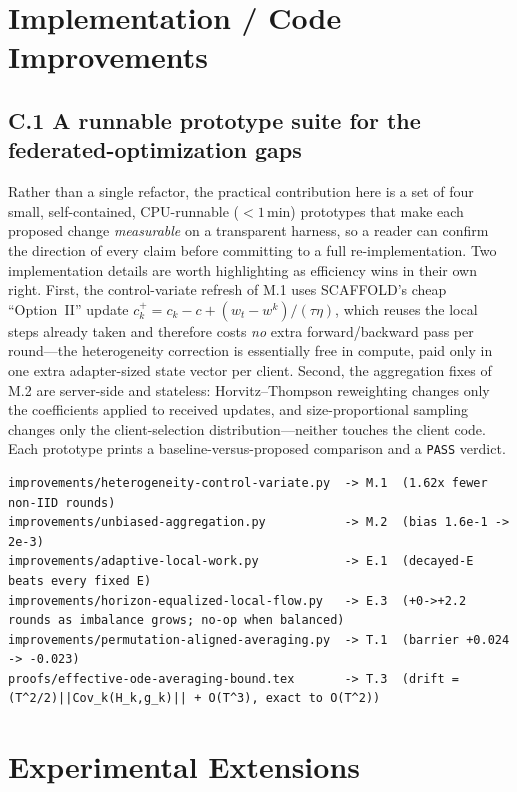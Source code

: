 \documentclass[11pt]{article}
\begin{document}
\section*{Implementation / Code Improvements}

\subsection*{C.1 A runnable prototype suite for the federated-optimization gaps}

Rather than a single refactor, the practical contribution here is a set of four small, self-contained, CPU-runnable ($<1$\,min) prototypes that make each proposed change \emph{measurable} on a transparent harness, so a reader can confirm the direction of every claim before committing to a full re-implementation. Two implementation details are worth highlighting as efficiency wins in their own right. First, the control-variate refresh of M.1 uses SCAFFOLD's cheap ``Option~II'' update $c_k^{+}=c_k-c+(w_t-w^k)/(\tau\eta)$, which reuses the local steps already taken and therefore costs \emph{no} extra forward/backward pass per round---the heterogeneity correction is essentially free in compute, paid only in one extra adapter-sized state vector per client. Second, the aggregation fixes of M.2 are server-side and stateless: Horvitz--Thompson reweighting changes only the coefficients applied to received updates, and size-proportional sampling changes only the client-selection distribution---neither touches the client code. Each prototype prints a baseline-versus-proposed comparison and a \texttt{PASS} verdict.

\begin{lstlisting}
improvements/heterogeneity-control-variate.py  -> M.1  (1.62x fewer non-IID rounds)
improvements/unbiased-aggregation.py           -> M.2  (bias 1.6e-1 -> 2e-3)
improvements/adaptive-local-work.py            -> E.1  (decayed-E beats every fixed E)
improvements/horizon-equalized-local-flow.py   -> E.3  (+0->+2.2 rounds as imbalance grows; no-op when balanced)
improvements/permutation-aligned-averaging.py  -> T.1  (barrier +0.024 -> -0.023)
proofs/effective-ode-averaging-bound.tex       -> T.3  (drift = (T^2/2)||Cov_k(H_k,g_k)|| + O(T^3), exact to O(T^2))
\end{lstlisting}

\section*{Experimental Extensions}
\end{document}
